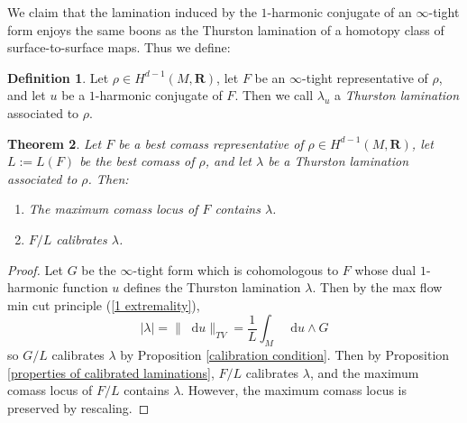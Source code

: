\documentclass[reqno,11pt]{amsart}
\newcommand{\RR}{\mathbf{R}}
\newcommand*\dif{\mathop{}\!\mathrm{d}}
\newcommand{\dfn}[1]{\emph{#1}\index{#1}}
\newtheorem{theorem}{Theorem}[section]
\theoremstyle{definition}
\newtheorem{definition}[theorem]{Definition}
\numberwithin{equation}{section}
\begin{document}
We claim that the lamination induced by the $1$-harmonic conjugate of an $\infty$-tight form enjoys the same boons as the Thurston lamination of a homotopy class of surface-to-surface maps.
Thus we define:

\begin{definition}
Let $\rho \in H^{d - 1}(M, \RR)$, let $F$ be an $\infty$-tight representative of $\rho$, and let $u$ be a $1$-harmonic conjugate of $F$.
Then we call $\lambda_u$ a \dfn{Thurston lamination} associated to $\rho$.
\end{definition}

\begin{theorem}\label{MCL contains Thurston}
Let $F$ be a best comass representative of $\rho \in H^{d - 1}(M, \RR)$, let $L := L(F)$ be the best comass of $\rho$, and let $\lambda$ be a Thurston lamination associated to $\rho$.
Then:
\begin{enumerate}
\item The maximum comass locus of $F$ contains $\lambda$.
\item $F/L$ calibrates $\lambda$.
\end{enumerate}
\end{theorem}
\begin{proof}
Let $G$ be the $\infty$-tight form which is cohomologous to $F$ whose dual $1$-harmonic function $u$ defines the Thurston lamination $\lambda$.
Then by the max flow min cut principle (\ref{1 extremality}), 
$$|\lambda| = \|\dif u\|_{TV} = \frac{1}{L} \int_M \dif u \wedge G$$
so $G/L$ calibrates $\lambda$ by Proposition \ref{calibration condition}.
Then by Proposition \ref{properties of calibrated laminations}, $F/L$ calibrates $\lambda$, and the maximum comass locus of $F/L$ contains $\lambda$.
However, the maximum comass locus is preserved by rescaling.
\end{proof}
\end{document}
